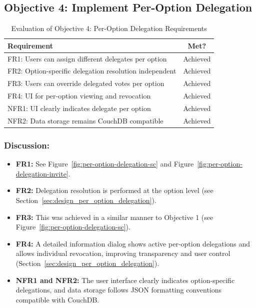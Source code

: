 \subsection{Objective 4: Implement Per-Option Delegation}

\begin{table}[H]
\centering
\begin{tabular}{|p{9cm}|c|}
\hline
\textbf{Requirement} & \textbf{Met?} \\ \hline
FR1: Users can assign different delegates per option & Achieved \\ \hline
FR2: Option-specific delegation resolution independent & Achieved \\ \hline
FR3: Users can override delegated votes per option & Achieved \\ \hline
FR4: UI for per-option viewing and revocation & Achieved \\ \hline
NFR1: UI clearly indicates delegate per option & Achieved \\ \hline
NFR2: Data storage remains CouchDB compatible & Achieved \\ \hline
\end{tabular}
\caption{Evaluation of Objective 4: Per-Option Delegation Requirements}
\label{tab:objective4_requirements}
\end{table}

\subsubsection{Discussion:}

\begin{itemize}
    \item \textbf{FR1:} See Figure~\ref{fig:per-option-delegation-sc} and Figure~\ref{fig:per-option-delegation-invite}.
    \item \textbf{FR2:} Delegation resolution is performed at the option level (see Section~\ref{sec:design_per_option_delegation}).
    \item \textbf{FR3:} This was achieved in a similar manner to Objective 1 (see Figure~\ref{fig:per-option-delegation-sc}).
    \item \textbf{FR4:} A detailed information dialog shows active per-option delegations and allows individual revocation, improving transparency and user control (Section~\ref{sec:design_per_option_delegation}).
    \item \textbf{NFR1 and NFR2:} The user interface clearly indicates option-specific delegations, and data storage follows JSON formatting conventions compatible with CouchDB.
\end{itemize}

